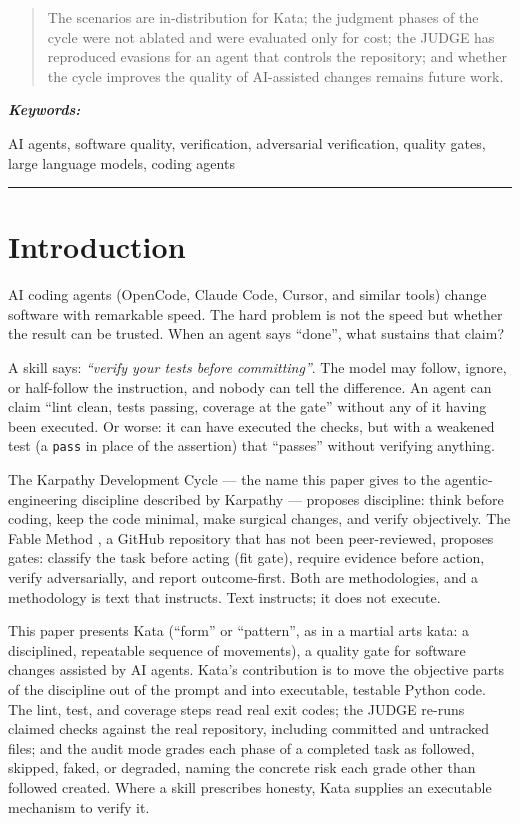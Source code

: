 \documentclass{sbc2019}%
\renewenvironment{keywords}{%
  \noindent\keywordfont\textit{\textbf{Keywords: }}%
}{\vskip6pt\hrule height .27pt\vskip12pt}
\begin{document}
\begin{frontmatter}
\begin{abstract}
The scenarios are in-distribution for Kata; the judgment phases of the cycle
were not ablated and were evaluated only for cost; the JUDGE has reproduced
evasions for an agent that controls the repository; and whether the cycle
improves the quality of AI-assisted changes remains future work.
\end{abstract}

\begin{keywords}
AI agents, software quality, verification, adversarial verification, quality gates, large language models, coding agents
\end{keywords}

\end{frontmatter}

\section{Introduction}
\label{sec:introduction}

AI coding agents (OpenCode, Claude Code, Cursor, and similar tools) change
software with remarkable speed. The hard problem is not the speed but whether
the result can be trusted. When an agent says ``done'', what sustains that
claim?

A skill says: \emph{``verify your tests before committing''}. The model may
follow, ignore, or half-follow the instruction, and nobody can tell the
difference. An agent can claim ``lint clean, tests passing, coverage at the
gate'' without any of it having been executed. Or worse: it can have executed
the checks, but with a weakened test (a \texttt{pass} in place of the
assertion) that ``passes'' without verifying anything.

The Karpathy Development Cycle --- the name this paper gives to the
agentic-engineering discipline described by Karpathy
\cite{karpathy} --- proposes discipline: think
before coding, keep the code minimal, make surgical changes, and verify
objectively. The Fable
Method \cite{fable}, a GitHub repository that has not been peer-reviewed,
proposes gates: classify the task before acting (fit
gate), require evidence before action, verify adversarially, and report
outcome-first. Both are methodologies, and a methodology is text that
instructs. Text instructs; it does not execute.

This paper presents Kata (``form'' or ``pattern'', as in a martial arts
kata: a disciplined, repeatable sequence of movements), a quality gate for
software changes assisted by AI agents. Kata's contribution is to move the
objective parts of the discipline out of the prompt and into executable,
testable Python code. The lint, test, and coverage steps read real exit codes;
the JUDGE re-runs claimed checks against the real repository, including
committed and untracked files; and the audit mode grades each phase of a
completed task as followed, skipped, faked, or degraded, naming the concrete
risk each grade other than followed created. Where a skill prescribes honesty,
Kata supplies an executable mechanism to verify it.
\end{document}
